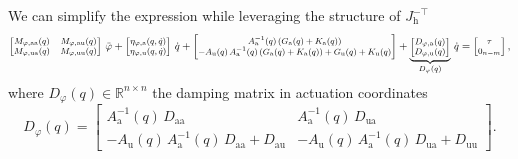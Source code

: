 We can simplify the expression while leveraging the structure of $J_\mathrm{h}^{-\top}$
\begin{equation}\footnotesize
    \begin{bmatrix}
        M_{\varphi,\mathrm{aa}}(q) & M_{\varphi,\mathrm{au}}(q)\\ 
        M_{\varphi,\mathrm{ua}}(q) & M_{\varphi,\mathrm{uu}}(q)
    \end{bmatrix} \, \ddot{\varphi} + \begin{bmatrix}
        \eta_{\varphi,\mathrm{a}}(q,\dot{q})\\ \eta_{\varphi,\mathrm{u}}(q,\dot{q})
    \end{bmatrix} \, \dot{q} + \begin{bmatrix}
        A_\mathrm{a}^{-1}(q) \left ( G_\mathrm{a}(q) + K_\mathrm{a}(q) \right )\\
        -A_\mathrm{u}(q) \, A_\mathrm{a}^{-1}(q) \left ( G_\mathrm{a}(q) + K_\mathrm{a}(q) \right ) + G_\mathrm{u}(q) + K_\mathrm{u}(q)
    \end{bmatrix} + \underbrace{\begin{bmatrix}
        D_{\varphi,\mathrm{a}}(q)\\
        D_{\varphi,\mathrm{u}}(q)
    \end{bmatrix}}_{D_\varphi(q)} \, \dot{q} = \begin{bmatrix}
        \tau\\ 0_{n-m}
    \end{bmatrix},
\end{equation}
where $D_{\varphi}(q) \in \mathbb{R}^{n \times n}$ the damping matrix in actuation coordinates
\begin{equation}
    D_{\varphi}(q) = \begin{bmatrix}
         A_\mathrm{a}^{-1}(q) \, D_\mathrm{aa} & A_\mathrm{a}^{-1}(q) \,  D_\mathrm{ua}\\
         -A_\mathrm{u}(q) \, A_\mathrm{a}^{-1}(q) \, D_\mathrm{aa} + D_\mathrm{au} & -A_\mathrm{u}(q) \, A_\mathrm{a}^{-1}(q) \, D_\mathrm{ua} + D_\mathrm{uu}
    \end{bmatrix}.
\end{equation}


